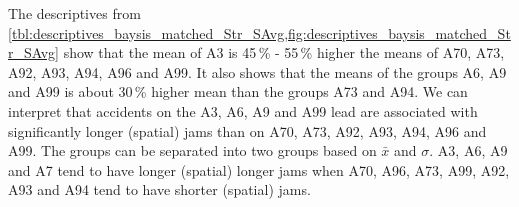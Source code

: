 The descriptives from \cref{tbl:descriptives_baysis_matched_Str_SAvg,fig:descriptives_baysis_matched_Str_SAvg} show that the mean of A3 is 45\,\% - 55\,\% higher the means of A70, A73, A92, A93, A94, A96 and A99. It also shows that the means of the groups A6, A9 and A99 is about 30\,\% higher mean than the groups A73 and A94. We can interpret that accidents on the A3, A6, A9 and A99 lead are associated with significantly longer (spatial) jams than on A70, A73, A92, A93, A94, A96 and A99. The groups can be separated into two groups based on $\bar{x}$ and $\sigma$. A3, A6, A9 and A7 tend to have longer (spatial) longer jams when A70, A96, A73, A99, A92, A93 and A94 tend to have shorter (spatial) jams.

